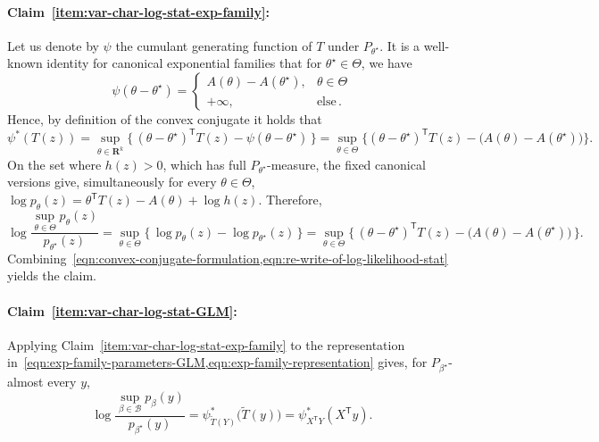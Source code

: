 \documentclass[11pt, letterpaper, hidelinks]{article}
\newcommand{\R}{\mathbf R}
\newcommand{\cB}{\mathcal{B}}
\newcommand{\1}{\mathbf 1}
\let\tilde\widetilde
\newcommand{\T}{\mathsf{T}}
\theoremstyle{plain}
\theoremstyle{definition}
\newcommand{\thetastar}{\theta^\star}
\newcommand{\betastar}{\beta^\star}
\begin{document}
\paragraph{Claim~\ref{item:var-char-log-stat-exp-family}:} 
Let us denote by $\psi$ the cumulant generating function of $T$ under $P_{\thetastar}$. It is a well-known identity for canonical exponential families that for $\thetastar \in \Theta$, we have~\cite[pp.~31] {keener2010theoretical}
   \begin{equation}
   \label{eq:mgf-partition}
   \psi(\theta - \thetastar) = \begin{cases} 
    A(\theta) - A(\thetastar), & \theta \in \Theta \\ 
    +\infty, & \text{else} \, .
    \end{cases}
   \end{equation}
    Hence, by definition of the convex conjugate it holds that
    \begin{equation}
    \psi^\ast(T(z)) = 
	    \sup_{\theta \in \R^k} 
    \Big\{\, 
    (\theta - \thetastar)^\T T(z) - \psi(\theta - \thetastar) \,\Big\} 
    =
    \sup_{\theta \in \Theta} 
    \Big\{(\theta - \thetastar)^\T T(z)- \big(A(\theta)- A(\thetastar)\big)\Big\}.
      \label{eqn:convex-conjugate-formulation}
    \end{equation}
    On the set where $h(z)>0$, which has full $P_{\thetastar}$-measure, the fixed canonical versions give, simultaneously for every $\theta\in\Theta$,
    $\log p_\theta(z) = \theta^\T T(z) -  A(\theta) + \log h(z)$. Therefore,
    \begin{equation}
    \label{eqn:re-write-of-log-likelihood-stat}
    \log \frac{\sup_{\theta \in \Theta} p_\theta(z)}{p_{\thetastar}(z)}= \sup_{\theta \in \Theta} \Big\{\, \log p_\theta(z) - \log p_{\thetastar}(z) \,\Big\} = 
    \sup_{\theta \in \Theta}
    \Big\{\, 
    (\theta - \thetastar)^\T T(z) - \big(A(\theta) - A(\thetastar)\big)
    \,\Big\}.
    \end{equation}
    Combining~\cref{eqn:convex-conjugate-formulation,eqn:re-write-of-log-likelihood-stat} yields the claim.

\paragraph{Claim~\ref{item:var-char-log-stat-GLM}:}

Applying Claim~\ref{item:var-char-log-stat-exp-family} to the representation
in~\cref{eqn:exp-family-parameters-GLM,eqn:exp-family-representation} gives, for
$P_{\betastar}$-almost every $y$,
\[
\log\frac{\sup_{\beta\in\cB}p_{\beta}(y)}{p_{\betastar}(y)}
=\psi_{\tilde T(Y)}^\ast\big(\tilde T(y)\big)
=\psi_{X^\T Y}^\ast(X^\T y).
\]
\end{document}
